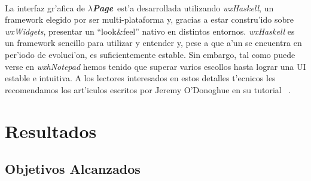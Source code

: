 \documentclass[a4paper]{article}
\newcommand{\hpage}{\textbf{\textsl{$\lambda$Page}}}
\begin{document}
\paragraph{}La interfaz gr'afica de \hpage\ est'a desarrollada utilizando \textsl{wxHaskell}, un framework elegido por ser multi-plataforma y, gracias a estar constru'ido sobre \textsl{wxWidgets}, presentar un ``look\&feel'' nativo en distintos entornos.  \textsl{wxHaskell} es un framework sencillo para utilizar y entender y, pese a que a'un se encuentra en per'iodo de evoluci'on, es suficientemente estable.  Sin embargo, tal como puede verse en \textsl{wxhNotepad} hemos tenido que superar varios escollos hasta lograr una UI estable e intuitiva.  A los lectores interesados en estos detalles t'ecnicos les recomendamos los art'iculos escritos por Jeremy O'Donoghue en su tutorial ~\cite{wewantarock}.

\newpage
\section{Resultados}
\subsection{Objetivos Alcanzados}
\begin{epigraphs}
\end{epigraphs}
\end{document}

